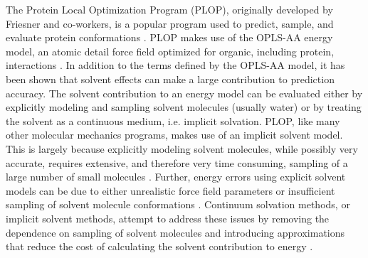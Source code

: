 The Protein Local Optimization Program (PLOP), originally developed by Friesner and co-workers, is a popular program used to predict, sample, and evaluate protein conformations \cite{jacobson2002role,jacobson2002force,jacobson2004hierarchical}.
PLOP makes use of the OPLS-AA energy model, an atomic detail force field optimized for organic, including protein, interactions \cite{jorgensen1996development}.
In addition to the terms defined by the OPLS-AA model, it has been shown that solvent effects can make a large contribution to prediction accuracy.
The solvent contribution to an energy model can be evaluated either by explicitly modeling and sampling solvent molecules (usually water) or by treating the solvent as a continuous medium, i.e. implicit solvation.
PLOP, like many other molecular mechanics programs, makes use of an implicit solvent model.
This is largely because explicitly modeling solvent molecules, while possibly very accurate, requires extensive, and therefore very time consuming, sampling of a large number of small molecules \cite{zhang2001solvent}.
Further, energy errors using explicit solvent models can be due to either unrealistic force field parameters or insufficient sampling of solvent molecule conformations \cite{zhou2003free}.
Continuum solvation methods, or implicit solvent methods, attempt to address these issues by removing the dependence on sampling of solvent molecules and introducing approximations that reduce the cost of calculating the solvent contribution to energy \cite{roux1999implicit}.

